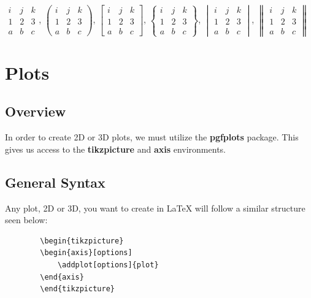 \documentclass[]{article}
\newcommand{\dent}{\hspace{\parindent}} %
\begin{document}
    $\begin{matrix} i & j & k \\ 1 & 2 & 3 \\ a & b & c \end{matrix}$, $\begin{pmatrix} i & j & k \\ 1 & 2 & 3 \\ a & b & c \end{pmatrix}$, $\begin{bmatrix} i & j & k \\ 1 & 2 & 3 \\ a & b & c \end{bmatrix}$, $\begin{Bmatrix} i & j & k \\ 1 & 2 & 3 \\ a & b & c \end{Bmatrix}$, $\begin{vmatrix} i & j & k \\ 1 & 2 & 3 \\ a & b & c \end{vmatrix}$, $\begin{Vmatrix} i & j & k \\ 1 & 2 & 3 \\ a & b & c \end{Vmatrix}$

    \section{Plots}
    \subsection{Overview}
    \dent In order to create 2D or 3D plots, we must utilize the \textbf{pgfplots} package. This gives us access to the \textbf{tikzpicture} and \textbf{axis} environments.
    \subsection{General Syntax}
    \dent Any plot, 2D or 3D, you want to create in LaTeX will follow a similar structure seen below:
    \begin{verbatim}
        \begin{tikzpicture}
        \begin{axis}[options]
            \addplot[options]{plot}
        \end{axis}
        \end{tikzpicture}
    \end{verbatim}
\end{document}
